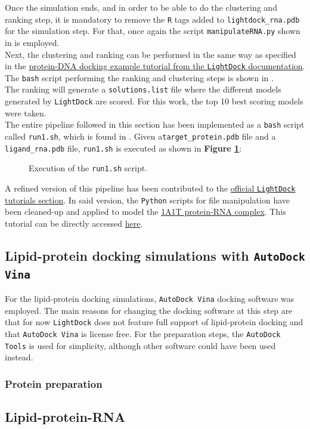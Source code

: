 Once the simulation ends, and in order to be able to do the clustering and ranking step, it is mandatory to remove the \texttt{R} tags added to \texttt{lightdock\_rna.pdb} for the simulation step. For that, once again the script \texttt{manipulateRNA.py} shown in \textbf{} is employed.\\

Next, the clustering and ranking can be performed in the same way as specified in the \href{https://lightdock.org/tutorials/0.9.3/dna_docking}{protein-DNA docking example tutorial from the \texttt{LightDock} documentation}. The \texttt{bash} script performing the ranking and clustering steps is shown in \textbf{}.\\

The ranking will generate a \texttt{solutions.list} file where the different models generated by \texttt{LightDock} are scored. For this work, the top 10 best scoring models were taken.\\

The entire pipeline followed in this section has been implemented as a \texttt{bash} script called \texttt{run1.sh}, which is found in \textbf{}. Given a\linebreak\texttt{target\_protein.pdb} file and a \texttt{ligand\_rna.pdb} file, \texttt{run1.sh} is executed as shown in \textbf{Figure \ref{fig:execrun1}}:

\begin{figure}[htbp!]
    
    \caption[Execution of the \texttt{run1.sh} script.]{Execution of the \texttt{run1.sh} script.}
    \label{fig:execrun1}
\end{figure}

A refined version of this pipeline has been contributed to the \href{https://lightdock.org/tutorials/0.9.3/index.html}{official \texttt{LightDock} tutorials section}. In said version, the \texttt{Python} scripts for file manipulation have been cleaned-up and applied to model the \href{https://www.rcsb.org/structure/1a1t}{1A1T protein-RNA complex}. This tutorial can be directly accessed \href{https://lightdock.org/tutorials/0.9.3/rna_docking}{here}.

\subsection{Lipid-protein docking simulations with \texttt{AutoDock Vina}}

For the lipid-protein docking simulations, \texttt{AutoDock Vina} docking software was employed. The main reasons for changing the docking software at this step are that for now \texttt{LightDock} does not feature full support of lipid-protein docking and that \texttt{AutoDock Vina} is license free. For the preparation steps, the \texttt{AutoDock Tools} is used for simplicity, although other software could have been used instead.

\subsubsection{Protein preparation}




\subsection{Lipid-protein-RNA}
